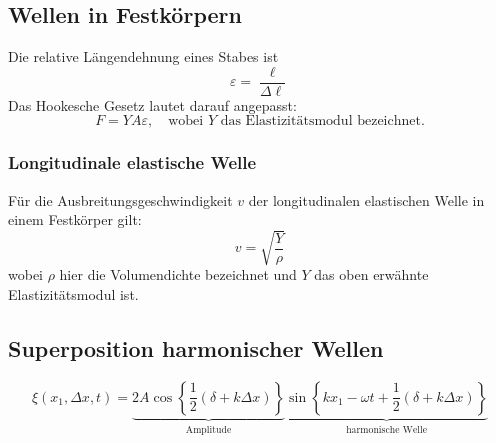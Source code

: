 \subsection{Wellen in Festkörpern}
Die relative Längendehnung eines Stabes ist 
\begin{equation}
\varepsilon = \dfrac{\ell}{\Delta \ell} 
\end{equation}
Das Hookesche Gesetz lautet darauf angepasst:
\begin{equation}
F = Y \! A \varepsilon, \quad \text{wobei } Y \text{ das Elastizitätsmodul bezeichnet.}
\end{equation}
\subsubsection{Longitudinale elastische Welle}
Für die Ausbreitungsgeschwindigkeit $v$ der longitudinalen elastischen Welle in einem Festkörper gilt:
\begin{equation}
v = \sqrt{\dfrac{Y}{\rho}} 
\end{equation}
wobei $\rho$ hier die Volumendichte bezeichnet und $Y$ das oben erwähnte Elastizitätsmodul ist.
\subsection{Superposition harmonischer Wellen}
\begin{equation}
\xi (x_1, \Delta x, t) = \underbrace{2A \cos \left\{ \dfrac{1}{2} \left( \delta + k \Delta x \right) \right\}}_{\text{Amplitude}} \underbrace{ \sin \left\{ kx_1 - \omega t + \dfrac{1}{2} \left( \delta + k \Delta x \right) \right\}}_{\text{harmonische Welle}}
\end{equation}